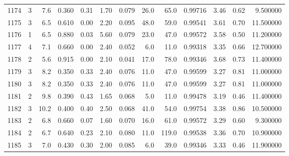 \begin{tabular}{lrrrrrrrrrrrr}
1174 &        3 &            7.6 &             0.360 &         0.31 &            1.70 &      0.079 &                 26.0 &                  65.0 &  0.99716 &  3.46 &       0.62 &   9.500000 \\
1175 &        3 &            6.5 &             0.610 &         0.00 &            2.20 &      0.095 &                 48.0 &                  59.0 &  0.99541 &  3.61 &       0.70 &  11.500000 \\
1176 &        1 &            6.5 &             0.880 &         0.03 &            5.60 &      0.079 &                 23.0 &                  47.0 &  0.99572 &  3.58 &       0.50 &  11.200000 \\
1177 &        4 &            7.1 &             0.660 &         0.00 &            2.40 &      0.052 &                  6.0 &                  11.0 &  0.99318 &  3.35 &       0.66 &  12.700000 \\
1178 &        2 &            5.6 &             0.915 &         0.00 &            2.10 &      0.041 &                 17.0 &                  78.0 &  0.99346 &  3.68 &       0.73 &  11.400000 \\
1179 &        3 &            8.2 &             0.350 &         0.33 &            2.40 &      0.076 &                 11.0 &                  47.0 &  0.99599 &  3.27 &       0.81 &  11.000000 \\
1180 &        3 &            8.2 &             0.350 &         0.33 &            2.40 &      0.076 &                 11.0 &                  47.0 &  0.99599 &  3.27 &       0.81 &  11.000000 \\
1181 &        2 &            9.8 &             0.390 &         0.43 &            1.65 &      0.068 &                  5.0 &                  11.0 &  0.99478 &  3.19 &       0.46 &  11.400000 \\
1182 &        3 &           10.2 &             0.400 &         0.40 &            2.50 &      0.068 &                 41.0 &                  54.0 &  0.99754 &  3.38 &       0.86 &  10.500000 \\
1183 &        2 &            6.8 &             0.660 &         0.07 &            1.60 &      0.070 &                 16.0 &                  61.0 &  0.99572 &  3.29 &       0.60 &   9.300000 \\
1184 &        2 &            6.7 &             0.640 &         0.23 &            2.10 &      0.080 &                 11.0 &                 119.0 &  0.99538 &  3.36 &       0.70 &  10.900000 \\
1185 &        3 &            7.0 &             0.430 &         0.30 &            2.00 &      0.085 &                  6.0 &                  39.0 &  0.99346 &  3.33 &       0.46 &  11.900000 \\

\end{tabular}
